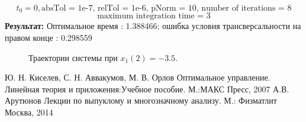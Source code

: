 \documentclass[10pt]{article}
\begin{document}
\[ t_0 = 0, \text{absTol = 1e-7, relTol = 1e-6, pNorm = 10, number of iterations = 8}\]  
\[\text{maximum integration time = 3} \]
\textbf{Результат:} Оптимальное время : 1.388466; ошибка условия трансверсальности на правом конце : 0.298559
\medskip\\
\begin{figure}[h!]
	\caption*{Траектории системы при \( x_1(2) = -3.5 \).}
\end{figure}
\newpage
\begin{thebibliography}{3}
Ю. Н. Киселев, С. Н. Аввакумов, М. В. Орлов Оптимальное управление. Линейная теория и приложения:Учебное пособие. М.:МАКС Пресс, 2007
А.В. Арутюнов Лекции по выпуклому и многозначному анализу. М.: Физматлит Москва, 2014
\end{thebibliography}
\end{document}
